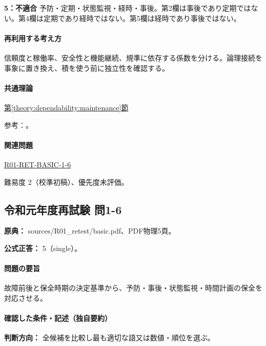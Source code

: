 \noindent\textbf{5：不適合} 予防・定期・状態監視・経時・事後。第2欄は事後であり定期ではない。第4欄は定期であり経時ではない。第5欄は経時であり事後ではない。\par

\paragraph{再利用する考え方} 信頼度と稼働率、安全性と機能継続、規準に依存する係数を分ける。論理接続を事象に置き換え、積を使う前に独立性を確認する。

\paragraph{共通理論} \hyperref[theory:dependability:maintenance]{第\ref*{theory:dependability:maintenance}節}

\par 参考：\cite{maintenance_mlit_2013}。

\paragraph{関連問題} \hyperref[q:r01-ret-basic-1-6]{R01-RET-BASIC-1-6}

\par 難易度 2（校準初稿）、優先度未評価。

\subsection{令和元年度再試験 問1-6}
\label{q:r01-ret-basic-1-6}

\noindent\textbf{原典：} sources/R01\_retest/basic.pdf、PDF物理5頁。

\textbf{公式正答：} 5（single）。

\paragraph{問題の要旨} 故障前後と保全時期の決定基準から、予防・事後・状態監視・時間計画の保全を対応させる。

\paragraph{確認した条件・記述（独自要約）}\mbox{}\par

\noindent\textbf{判断方向：} 全候補を比較し最も適切な語又は数値・順位を選ぶ。\par

